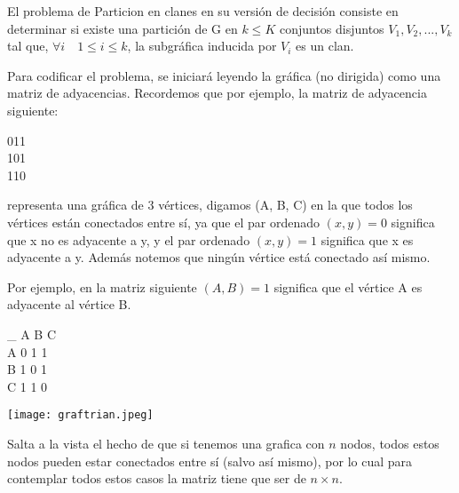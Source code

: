 \documentclass[12pt,letterpaper]{article}
\begin{document}
El problema de Particion en clanes en su versión de decisión consiste en determinar si existe una partición de G en $k \leq K$ conjuntos disjuntos $V_1, V_2, ... , V_k$ tal que, $\forall i\quad 1 \leq i \leq k$, la subgráfica inducida por $V_i$ es un clan.

Para codificar el problema, se iniciará leyendo la gráfica (no dirigida) como una matriz de adyacencias. Recordemos que por ejemplo, la matriz de adyacencia siguiente:

\begin{center}
011\\
101\\
110\\
\end{center}


representa una gráfica de 3 vértices, digamos (A, B, C) en la que todos los vértices están conectados entre sí, ya que el par ordenado $(x,y) = 0$ significa que x no es adyacente a y, y el par ordenado $(x,y)= 1$ significa que x es adyacente a y. Además notemos que ningún vértice está conectado así mismo.

Por ejemplo, en la matriz siguiente $(A,B)=1$ significa que el vértice A es adyacente al vértice B.\\

\begin{center}
\_ A B C \\
A  0 1 1 \\
B  1 0 1 \\
C  1 1 0 \\
    
\end{center}

\begin{center}
    \texttt{[image: graftrian.jpeg]}
\end{center}
Salta a la vista el hecho de que si tenemos una grafica con $n$ nodos, todos estos nodos pueden estar conectados entre sí (salvo así mismo), por lo cual para contemplar todos estos casos la matriz tiene que ser de $n \times n$.


\end{document}
